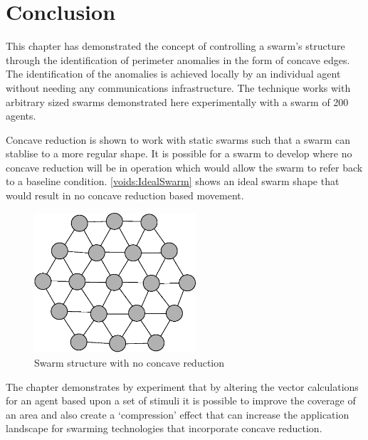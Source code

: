\section{Conclusion}\label{voids:Conclusion}
This chapter has demonstrated the concept of controlling a swarm's structure through the identification of perimeter anomalies in the form of concave edges. The identification of the anomalies is achieved locally by an individual agent without needing any communications infrastructure. The technique works with arbitrary sized swarms demonstrated here experimentally with a swarm of 200 agents.

Concave reduction is shown to work with static swarms such that a swarm can stablise to a more regular shape. It is possible for a swarm to develop where no concave reduction will be in operation which would allow the swarm to refer back to a baseline condition. \autoref{voids:IdealSwarm} shows an ideal swarm shape that would result in no concave reduction based movement. 

\begin{figure}[H]
\begin{center}
\includegraphics[width=6cm]{CHAPTER-7/figures/IdealSwarm}
\end{center}
\caption{Swarm structure with no concave reduction\label{voids:IdealSwarm}}
\end{figure}

The chapter demonstrates by experiment that by altering the vector calculations for an agent based upon a set of stimuli it is possible to improve the coverage of an area and also create a `compression' effect that can increase the application landscape for swarming technologies that incorporate concave reduction.
